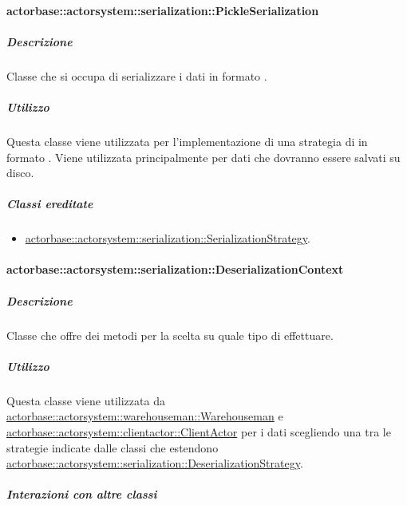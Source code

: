 \documentclass{scalatekids-article}
\begin{document}
\paragraph{actorbase::actorsystem::serialization::PickleSerialization}
\label{sec:actorbase::actorsystem::serialization::PickleSerialization}

\subparagraph{Descrizione}

Classe che si occupa di serializzare i dati in formato .

\subparagraph{Utilizzo}

Questa classe viene utilizzata per l'implementazione di una strategia di
 in formato . Viene utilizzata principalmente per
dati che dovranno essere salvati su disco.

\subparagraph{Classi ereditate}

\begin{itemize}

\item \hyperref[sec:actorbase::actorsystem::serialization::SerializationStrategy]{actorbase::actorsystem::serialization::SerializationStrategy}.

\end{itemize}

\paragraph{actorbase::actorsystem::serialization::DeserializationContext}
\label{sec:actorbase::actorsystem::serialization::DeserializationContext}

\subparagraph{Descrizione}

Classe che offre dei metodi per la scelta su quale tipo di 
effettuare.

\subparagraph{Utilizzo}

Questa classe viene utilizzata da \hyperref[sec:actorbase::actorsystem::warehouseman::Warehouseman]{actorbase::actorsystem::warehouseman::Warehouseman}
e \hyperref[sec:actorbase::actorsystem::clientactor::ClientActor]{actorbase::\allowbreak{}actorsystem::\allowbreak{}clientactor::\allowbreak{}ClientActor}
per  i dati scegliendo una tra le strategie indicate
dalle classi che estendono \hyperref[sec:actorbase::actorsystem::serialization::DeserializationStrategy]{actorbase::\allowbreak{}actorsystem::\allowbreak{}serialization::\allowbreak{}DeserializationStrategy}.

\subparagraph{Interazioni con altre classi}
\end{document}
